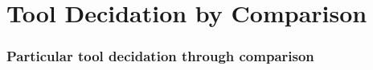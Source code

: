 \setcounter{section}{0}
\part{Tool Decidation by Comparison}\label{sec:toolComparison}

\section{Particular tool decidation through comparison}


\newpage